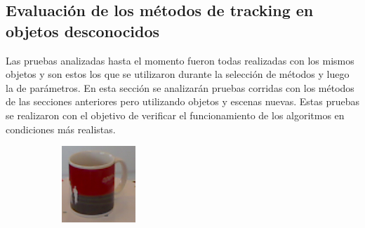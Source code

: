 \subsection{Evaluación de los métodos de tracking en objetos desconocidos}
Las pruebas analizadas hasta el momento fueron todas realizadas con los mismos objetos y son estos los que se utilizaron durante la selección de métodos y luego la de parámetros. En esta sección se analizarán pruebas corridas con los métodos de las secciones anteriores pero utilizando objetos y escenas nuevas. Estas pruebas se realizaron con el objetivo de verificar el funcionamiento de los algoritmos en condiciones más realistas.

\begin{figure}
	\centering
	\begin{subfigure}[b]{0.3\textwidth}
		\includegraphics[width=\textwidth]{img/obj_nuevos/coffee_mug.png}
	\end{subfigure}
	\quad
	\begin{subfigure}[b]{0.3\textwidth}

\end{subfigure}
\end{figure}
